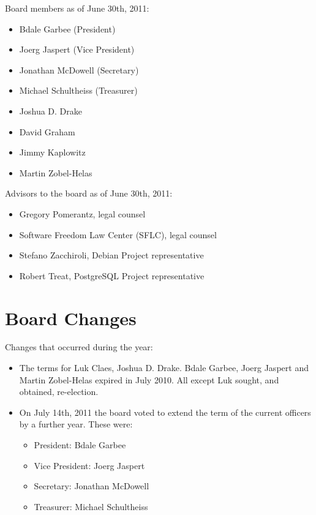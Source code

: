 \documentclass[letterpaper]{report}
\begin{document}
Board members as of June 30th, 2011:

\begin{itemize}
\item Bdale Garbee (President)
\item Joerg Jaspert (Vice President)
\item Jonathan McDowell (Secretary)
\item Michael Schultheiss (Treasurer)
\item Joshua D. Drake
\item David Graham
\item Jimmy Kaplowitz
\item Martin Zobel-Helas
\end{itemize}

Advisors to the board as of June 30th, 2011:

\begin{itemize}
\item Gregory Pomerantz, legal counsel
\item Software Freedom Law Center (SFLC), legal counsel
\item Stefano Zacchiroli, Debian Project representative
\item Robert Treat, PostgreSQL Project representative
\end{itemize}

\section{Board Changes}

Changes that occurred during the year:

\begin{itemize}
\item The terms for Luk Claes, Joshua D. Drake. Bdale Garbee, Joerg Jaspert and
Martin Zobel-Helas expired in July 2010. All except Luk sought, and obtained,
re-election.
\item On July 14th, 2011 the board voted to extend the term of the current
officers by a further year. These were:
\begin{itemize}
\item President: Bdale Garbee
\item Vice President: Joerg Jaspert
\item Secretary: Jonathan McDowell
\item Treasurer: Michael Schultheiss
\end{itemize}
\end{itemize}
\end{document}
